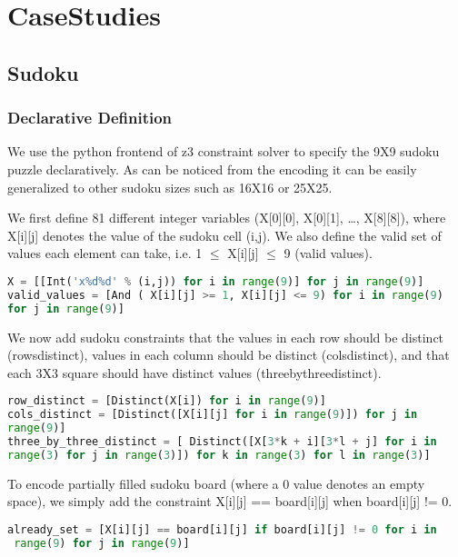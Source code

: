 \section{CaseStudies}

\subsection{Sudoku}

\subsubsection{Declarative Definition}
We use the python frontend of z3 constraint solver to specify the 9X9
sudoku puzzle declaratively. As can be noticed from the encoding it
can be easily generalized to other sudoku sizes such as 16X16 or
25X25.


We first define 81 different integer variables (X[0][0], X[0][1], \ldots,
X[8][8]), where X[i][j] denotes the value of the sudoku cell (i,j). We
also define the valid set of values each element can take, i.e. 1 $\leq$
X[i][j] $\leq$ 9 (valid values).

\begin{lstlisting}[language=python]
X = [[Int('x%d%d' % (i,j)) for i in range(9)] for j in range(9)]
valid_values = [And ( X[i][j] >= 1, X[i][j] <= 9) for i in range(9)
for j in range(9)]

\end{lstlisting}

We now add sudoku constraints that the values in each row should be
distinct (rows\textunderscore distinct), values in each column should be distinct
(cols\textunderscore distinct), and that each 3X3 square should have distinct values
(three\textunderscore by\textunderscore three\textunderscore distinct).

\begin{lstlisting}[language=python]
row_distinct = [Distinct(X[i]) for i in range(9)]
cols_distinct = [Distinct([X[i][j] for i in range(9)]) for j in
range(9)] 
three_by_three_distinct = [ Distinct([X[3*k + i][3*l + j] for i in
range(3) for j in range(3)]) for k in range(3) for l in range(3)]

\end{lstlisting}

To encode partially filled sudoku board (where a 0 value denotes an
empty space), we simply add the constraint X[i][j] == board[i][j] when
board[i][j] != 0. 

\begin{lstlisting}[language=python]
 already_set = [X[i][j] == board[i][j] if board[i][j] != 0 for i in
 range(9) for j in range(9)]

\end{lstlisting}

